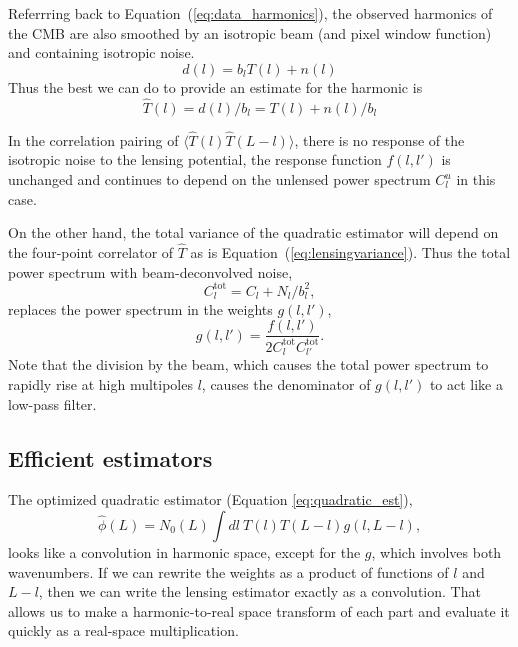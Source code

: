 Referrring back to Equation~(\ref{eq:data_harmonics}), the observed harmonics of the CMB are also smoothed by an isotropic beam (and pixel window function) and containing isotropic noise.
\begin{equation}
  d(l) = b_l T(l) + n(l)
\end{equation}
Thus the best we can do to provide an estimate for the harmonic is
\begin{equation}
\hat T(l) = d(l)/b_l = T(l) + n(l)/b_l
\end{equation}

In the correlation pairing of $\langle \hat T(l) \hat T(L-l) \rangle$, there is no response of the isotropic noise to the lensing potential, the response function $f(l,l')$ is unchanged and continues to depend on the unlensed power spectrum $C^u_l$ in this case.

On the other hand, the total variance of the quadratic estimator will depend on the four-point correlator of $\hat T$ as is Equation~(\ref{eq:lensingvariance}).
Thus the total power spectrum with beam-deconvolved noise,
\begin{equation}
C_l^\mathrm{tot} = C_l + N_l/b_l^2,
\end{equation}
replaces the power spectrum in the weights $g(l,l')$,
\begin{equation}
  g(l,l') = \frac{f(l,l')}{2 C^\mathrm{tot}_l C^\mathrm{tot}_{l'}}.
\end{equation}
Note that the division by the beam, which causes the total power spectrum to rapidly rise at high multipoles $l$, causes the denominator of $g(l,l')$ to act like a low-pass filter.

\subsection{Efficient estimators}
The optimized quadratic estimator (Equation \ref{eq:quadratic_est}),
\begin{equation}
  \hat\phi(L) = N_0(L) \int dl\  T(l) T(L-l) g(l,L-l),  
\end{equation}
looks like a convolution in harmonic space, except for the $g$, which involves both wavenumbers.  If we can rewrite the weights as a product of functions of $l$ and $L-l$, then we can write the lensing estimator exactly as a convolution.  That allows us to make a harmonic-to-real space transform of each part and evaluate it quickly as a real-space multiplication.

